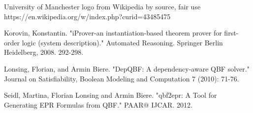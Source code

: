 \begin{thebibliography}{11}

University of Manchester logo from Wikipedia by source, fair use\newline
https://en.wikipedia.org/w/index.php?curid=43485475

Korovin, Konstantin. "iProver-an instantiation-based theorem prover for first-order logic (system description)." Automated Reasoning. Springer Berlin Heidelberg, 2008. 292-298.

Lonsing, Florian, and Armin Biere. "DepQBF: A dependency-aware QBF solver." Journal on Satisfiability, Boolean Modeling and Computation 7 (2010): 71-76.

Seidl, Martina, Florian Lonsing and Armin Biere. "qbf2epr: A Tool for Generating EPR Formulas from QBF." PAAR@ IJCAR. 2012.
  

\end{thebibliography}
